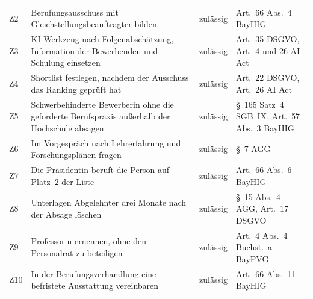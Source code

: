 \begin{small}
\begin{longtable}{@{}>{\raggedright\arraybackslash}p{0.8cm}>{\raggedright\arraybackslash}p{7.2cm}>{\raggedright\arraybackslash}p{1.9cm}>{\raggedright\arraybackslash}p{4.5cm}@{}}
Z2 & Berufungsausschuss mit Gleichstellungsbeauftragter bilden & zulässig & Art.~66 Abs.~4 BayHIG \\
Z3 & KI-Werkzeug nach Folgenabschätzung, Information der Bewerbenden und Schulung einsetzen & zulässig & Art.~35 DSGVO, Art.~4 und 26 AI Act \\
Z4 & Shortlist festlegen, nachdem der Ausschuss das Ranking geprüft hat & zulässig & Art.~22 DSGVO, Art.~26 AI Act \\
Z5 & Schwerbehinderte Bewerberin ohne die geforderte Berufspraxis außerhalb der Hochschule absagen & zulässig & §~165 Satz~4 SGB~IX, Art.~57 Abs.~3 BayHIG \\
Z6 & Im Vorgespräch nach Lehrerfahrung und Forschungsplänen fragen & zulässig & §~7 AGG \\
Z7 & Die Präsidentin beruft die Person auf Platz~2 der Liste & zulässig & Art.~66 Abs.~6 BayHIG \\
Z8 & Unterlagen Abgelehnter drei Monate nach der Absage löschen & zulässig & §~15 Abs.~4 AGG, Art.~17 DSGVO \\
Z9 & Professorin ernennen, ohne den Personalrat zu beteiligen & zulässig & Art.~4 Abs.~4 Buchst.~a BayPVG \\
Z10 & In der Berufungsverhandlung eine befristete Ausstattung vereinbaren & zulässig & Art.~66 Abs.~11 BayHIG \\
\end{longtable}
\end{small}
